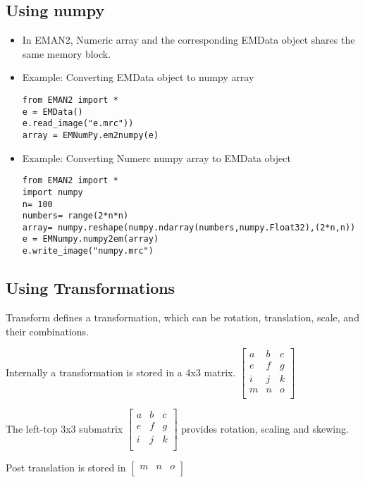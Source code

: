     \subsection{Using numpy} 
    \begin{itemize}
      \item
	In EMAN2,  Numeric array and the corresponding EMData object shares the same memory block.
      \item
	Example: Converting EMData object to numpy array
	{
	\begin {verbatim}from EMAN2 import *
e = EMData()
e.read_image("e.mrc"))
array = EMNumPy.em2numpy(e)\end{verbatim}}
      \item
	Example: Converting Numerc numpy array to EMData object
	{
	\begin{verbatim}from EMAN2 import *
import numpy
n= 100
numbers= range(2*n*n)
array= numpy.reshape(numpy.ndarray(numbers,numpy.Float32),(2*n,n))
e = EMNumpy.numpy2em(array)
e.write_image("numpy.mrc")\end{verbatim}}
    \end{itemize}

    \subsection{Using Transformations} 
    Transform defines a transformation, which can be rotation,
    translation, scale, and their combinations.
    
    Internally a transformation is stored in a 4x3 matrix.
    \( \left[ \begin{array}{ccc}
        a&b&c\\
        e&f&g\\
        i&j&k\\
         m&n&o\\
      \end{array} \right] \)
    
    The left-top 3x3 submatrix
    \(\left[ \begin{array}{ccc}
        a& b& c\\
         e& f& g\\
         i& j& k\\
      \end{array} \right] \) 
    provides rotation, scaling and skewing.
    
    Post translation is stored in 
      \( \left[ \begin{array}{ccc}
	  m&n&o\\
	\end{array} \right] \)
      
